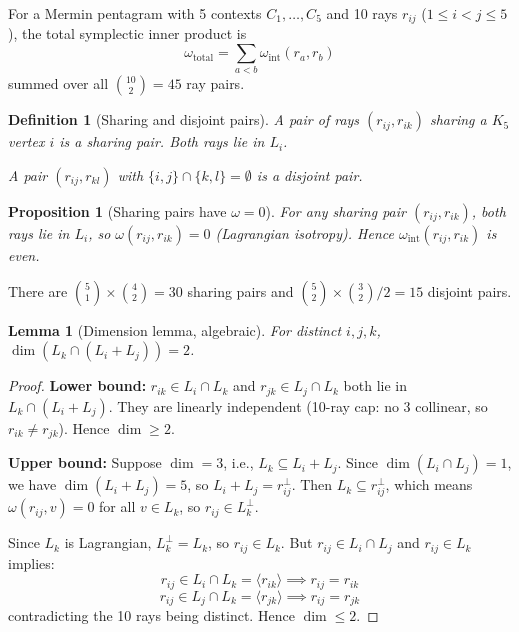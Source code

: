 \documentclass[11pt,a4paper]{article}
\newtheorem{lemma}[theorem]{Lemma}
\newtheorem{proposition}[theorem]{Proposition}
\newtheorem{definition}[theorem]{Definition}
\theoremstyle{remark}
\begin{document}
For a Mermin pentagram with 5 contexts $C_1, \ldots, C_5$ and 10 rays
$r_{ij}$ ($1 \leq i < j \leq 5$), the total symplectic inner product is
\[
\omega_{\text{total}} = \sum_{a < b} \omega_{\text{int}}(r_a, r_b)
\]
summed over all $\binom{10}{2} = 45$ ray pairs.

\begin{definition}[Sharing and disjoint pairs]
  A pair of rays $(r_{ij}, r_{ik})$ sharing a $K_5$ vertex $i$ is a
  \emph{sharing pair}. Both rays lie in $L_i$.

  A pair $(r_{ij}, r_{kl})$ with $\{i,j\} \cap \{k,l\} = \emptyset$ is
  a \emph{disjoint pair}.
\end{definition}

\begin{proposition}[Sharing pairs have $\omega = 0$]
  For any sharing pair $(r_{ij}, r_{ik})$, both rays lie in $L_i$, so
  $\omega(r_{ij}, r_{ik}) = 0$ (Lagrangian isotropy). Hence
  $\omega_{\text{int}}(r_{ij}, r_{ik})$ is even.
\end{proposition}

There are $\binom{5}{1} \times \binom{4}{2} = 30$ sharing pairs and
$\binom{5}{2} \times \binom{3}{2} / 2 = 15$ disjoint pairs.

\begin{lemma}[Dimension lemma, algebraic]
\label{lem:dim2}
  For distinct $i, j, k$, $\dim(L_k \cap (L_i + L_j)) = 2$.
\end{lemma}

\begin{proof}
  \textbf{Lower bound:} $r_{ik} \in L_i \cap L_k$ and
  $r_{jk} \in L_j \cap L_k$ both lie in $L_k \cap (L_i + L_j)$. They
  are linearly independent (10-ray cap: no 3 collinear, so
  $r_{ik} \neq r_{jk}$). Hence $\dim \geq 2$.

  \textbf{Upper bound:} Suppose $\dim = 3$, i.e.,
  $L_k \subseteq L_i + L_j$. Since $\dim(L_i \cap L_j) = 1$, we have
  $\dim(L_i + L_j) = 5$, so $L_i + L_j = r_{ij}^\perp$. Then
  $L_k \subseteq r_{ij}^\perp$, which means $\omega(r_{ij}, v) = 0$ for
  all $v \in L_k$, so $r_{ij} \in L_k^\perp$.

  Since $L_k$ is Lagrangian, $L_k^\perp = L_k$, so $r_{ij} \in L_k$.
  But $r_{ij} \in L_i \cap L_j$ and $r_{ij} \in L_k$ implies:
  \[
  r_{ij} \in L_i \cap L_k = \langle r_{ik} \rangle \implies r_{ij} = r_{ik}
  \]
  \[
  r_{ij} \in L_j \cap L_k = \langle r_{jk} \rangle \implies r_{ij} = r_{jk}
  \]
  contradicting the 10 rays being distinct. Hence $\dim \leq 2$.
\end{proof}
\end{document}
